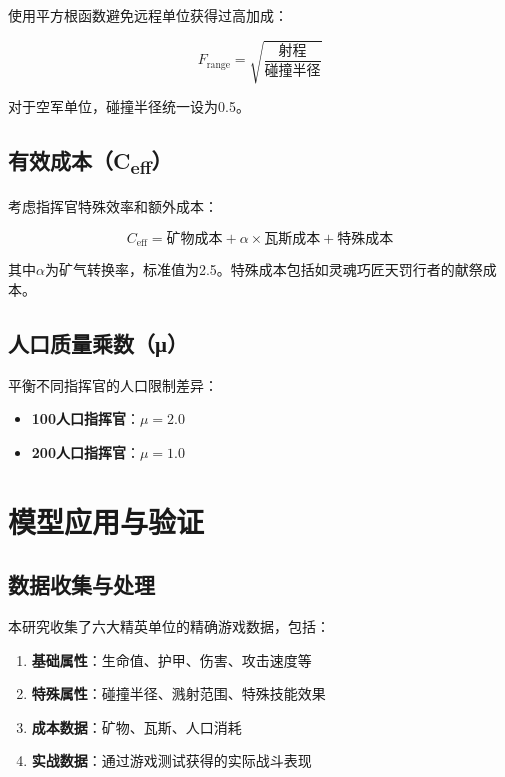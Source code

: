 \documentclass[a4paper,12pt]{article}
\begin{document}
使用平方根函数避免远程单位获得过高加成：

\begin{equation}
F_{\text{range}} = \sqrt{\frac{\text{射程}}{\text{碰撞半径}}}
\end{equation}

对于空军单位，碰撞半径统一设为0.5。

\subsection{有效成本（C\textsubscript{eff}）}

考虑指挥官特殊效率和额外成本：

\begin{equation}
C_{\text{eff}} = \text{矿物成本} + \alpha \times \text{瓦斯成本} + \text{特殊成本}
\end{equation}

其中$\alpha$为矿气转换率，标准值为2.5。特殊成本包括如灵魂巧匠天罚行者的献祭成本。

\subsection{人口质量乘数（μ）}

平衡不同指挥官的人口限制差异：

\begin{itemize}
    \item \textbf{100人口指挥官}：$\mu = 2.0$
    \item \textbf{200人口指挥官}：$\mu = 1.0$
\end{itemize}

\section{模型应用与验证}

\subsection{数据收集与处理}

本研究收集了六大精英单位的精确游戏数据，包括：

\begin{enumerate}
    \item \textbf{基础属性}：生命值、护甲、伤害、攻击速度等
    \item \textbf{特殊属性}：碰撞半径、溅射范围、特殊技能效果
    \item \textbf{成本数据}：矿物、瓦斯、人口消耗
    \item \textbf{实战数据}：通过游戏测试获得的实际战斗表现
\end{enumerate}
\end{document}
